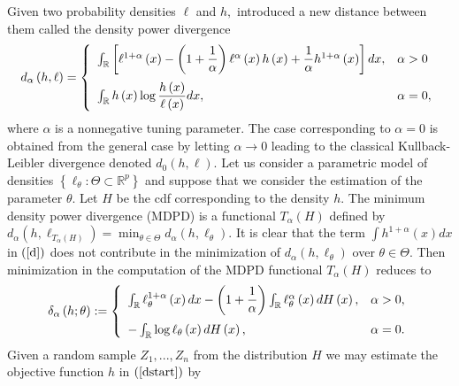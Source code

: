 \documentclass[12pt,reqno,openbib,runningheads,a4paper,portrait]{amsart}%
\begin{document}
\noindent Given two probability densities $\ell$ and $h,$ \cite{Basu98}
introduced a new distance between them called the density power divergence
\begin{equation}
d_{\alpha}\left(  h,\ell\right)  =\left\{
\begin{array}
[c]{ll}%
\int_{\mathbb{R}}\left[  \ell^{1+\alpha}\left(  x\right)  -\left(  1+\dfrac
{1}{\alpha}\right)  \ell^{\alpha}\left(  x\right)  h\left(  x\right)
+\dfrac{1}{\alpha}h^{1+\alpha}\left(  x\right)  \right]  dx, & \alpha
>0\medskip\\
\int_{\mathbb{R}}h\left(  x\right)  \log\dfrac{h\left(  x\right)  }%
{\ell\left(  x\right)  }dx, & \alpha=0,
\end{array}
\right.  \label{d}%
\end{equation}
where $\alpha$ is a nonnegative tuning parameter. The case corresponding to
$\alpha=0$ is obtained from the general case by letting $\alpha\rightarrow0$
leading to the classical Kullback-Leibler divergence denoted $d_{0}\left(
h,\ell\right)  .$ Let us consider a parametric model of densities $\left\{
\ell_{\theta}:\Theta\subset\mathbb{R}^{p}\right\}  $ and suppose that we
consider the estimation of the parameter $\theta.$ Let $H$ be the cdf
corresponding to the density $h.$ The minimum density power divergence (MDPD)
is a functional $T_{\alpha}\left(  H\right)  $ defined by $d_{\alpha}\left(
h,\ell_{T_{\alpha}\left(  H\right)  }\right)  =\min_{\theta\in\Theta}%
d_{\alpha}\left(  h,\ell_{\theta}\right)  .$ It is clear that the term $\int
h^{1+\alpha}\left(  x\right)  dx$ in $\left(  \ref{d}\right)  $ does not
contribute in the minimization of $d_{\alpha}\left(  h,\ell_{\theta}\right)  $
over $\theta\in\Theta.$ Then minimization in the computation of the MDPD
functional $T_{\alpha}\left(  H\right)  $ reduces to%
\begin{equation}
\delta_{\alpha}\left(  h;\theta\right)  :=\left\{
\begin{array}
[c]{lc}%
\int_{\mathbb{R}}\ell_{\theta}^{1+\alpha}\left(  x\right)  dx-\left(
1+\dfrac{1}{\alpha}\right)  \int_{\mathbb{R}}\ell_{\theta}^{\alpha}\left(
x\right)  dH\left(  x\right)  , & \alpha>0,\medskip\\
-\int_{\mathbb{R}}\log\ell_{\theta}\left(  x\right)  dH\left(  x\right)  , &
\alpha=0.
\end{array}
\right.  \label{dstart}%
\end{equation}
Given a random sample $Z_{1},...,Z_{n}$ from the distribution $H$ we may
estimate the objective function $h$ in $\left(  \ref{dstart}\right)  $ by
\end{document}

